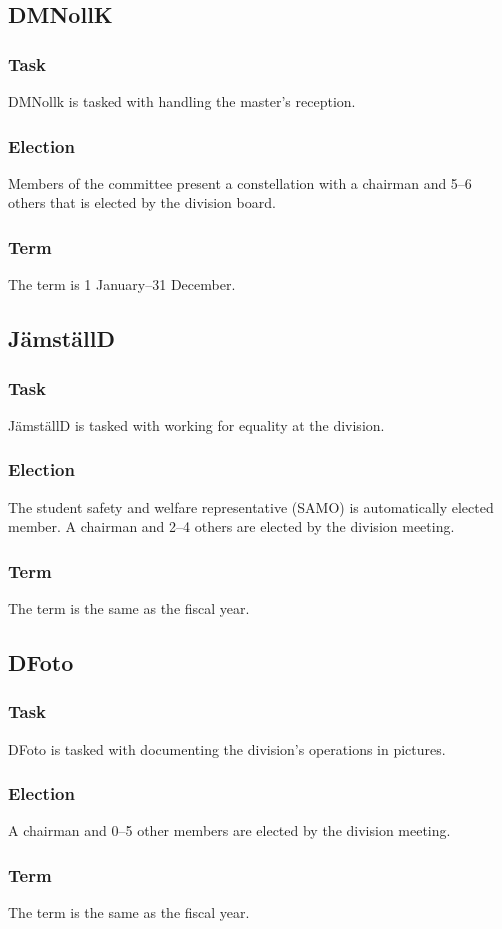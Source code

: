 \subsection{DMNollK}
\subsubsection{Task}
DMNollk is tasked with handling the master's reception. 
\subsubsection{Election}
Members of the committee present a constellation with a chairman and 5--6 others that is elected by the division board. 
\subsubsection{Term}
The term is 1 January--31 December.

\subsection{JämställD}
\subsubsection{Task}
JämställD is tasked with working for equality at the division.
\subsubsection{Election}
The student safety and welfare representative (SAMO) is automatically elected member. A chairman and 2--4 others are elected by the division meeting.
\subsubsection{Term}
The term is the same as the fiscal year.

\subsection{DFoto}
\subsubsection{Task}
DFoto is tasked with documenting the division's operations in pictures.
\subsubsection{Election}
A chairman and 0--5 other members are elected by the division meeting.
\subsubsection{Term}
The term is the same as the fiscal year. 

\newpage
